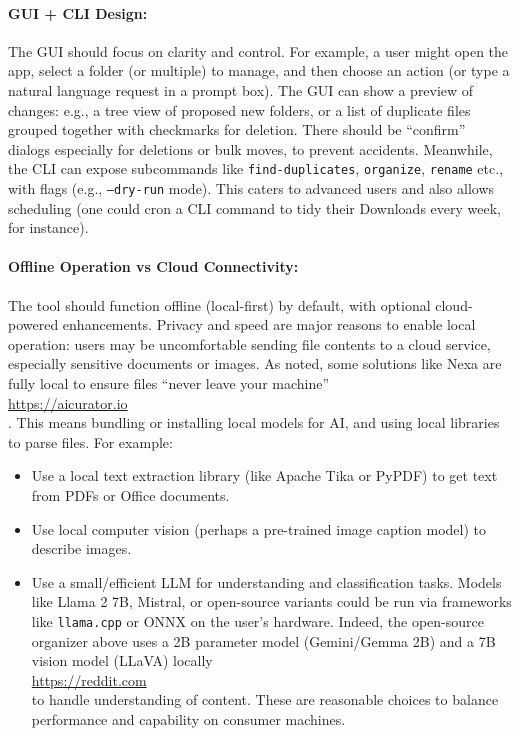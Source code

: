 \documentclass[11pt]{article}
\begin{document}
\paragraph{GUI + CLI Design:} The GUI should focus on clarity and control. For example, a user might open the app, select a folder (or multiple) to manage, and then choose an action (or type a natural language request in a prompt box). The GUI can show a preview of changes: e.g., a tree view of proposed new folders, or a list of duplicate files grouped together with checkmarks for deletion. There should be “confirm” dialogs especially for deletions or bulk moves, to prevent accidents. Meanwhile, the CLI can expose subcommands like \texttt{find-duplicates}, \texttt{organize}, \texttt{rename} etc., with flags (e.g., \texttt{--dry-run} mode). This caters to advanced users and also allows scheduling (one could cron a CLI command to tidy their Downloads every week, for instance).

\paragraph{Offline Operation vs Cloud Connectivity:} The tool should function offline (local-first) by default, with optional cloud-powered enhancements. Privacy and speed are major reasons to enable local operation: users may be uncomfortable sending file contents to a cloud service, especially sensitive documents or images. As noted, some solutions like Nexa are fully local to ensure files “never leave your machine” \\ \url{https://aicurator.io} \\ . This means bundling or installing local models for AI, and using local libraries to parse files. For example:
\begin{itemize}
  \item Use a local text extraction library (like Apache Tika or PyPDF) to get text from PDFs or Office documents.
  \item Use local computer vision (perhaps a pre-trained image caption model) to describe images.
  \item Use a small/efficient LLM for understanding and classification tasks. Models like Llama 2 7B, Mistral, or open-source variants could be run via frameworks like \texttt{llama.cpp} or ONNX on the user’s hardware. Indeed, the open-source organizer above uses a 2B parameter model (Gemini/Gemma 2B) and a 7B vision model (LLaVA) locally \\ \url{https://reddit.com} \\ to handle understanding of content. These are reasonable choices to balance performance and capability on consumer machines.
\end{itemize}
\end{document}
